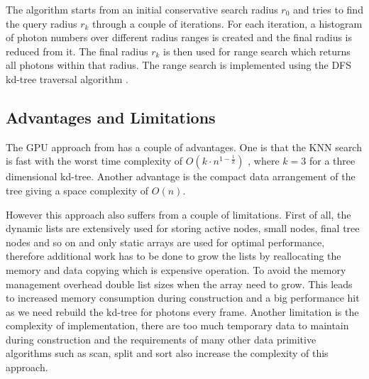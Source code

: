 The algorithm starts from an initial conservative search radius \(r_{0}\) and tries to find the query radius \(r_{k}\) through a couple of iterations. For each iteration, a histogram of photon numbers over different radius ranges is created and the final radius is reduced from it. The final radius \(r_{k}\) is then used for range search which returns all photons within that radius. The range search is implemented using the DFS kd-tree traversal algorithm \cite{Preparata:1985:CGI:4333}.

\subsection{Advantages and Limitations}
The GPU approach from \citeauthor{Zhou2008} has a couple of advantages. One is that the KNN search is fast with the worst time complexity of \(O(k\cdot n^{1-\frac{1}{k}})\) \cite{Lee1977}, where \(k = 3\) for a three dimensional kd-tree.
Another advantage is the compact data arrangement of the tree giving a space complexity of \(O(n)\).

However this approach also suffers from a couple of limitations. First of all, the dynamic lists are extensively used for storing active nodes, small nodes, final tree nodes and so on and only static arrays are used for optimal performance, therefore additional work has to be done to grow the lists by reallocating the memory and data copying which is expensive operation. To avoid the memory management overhead \citeauthor{Zhou2008} double list sizes when the array need to grow. This leads to increased memory consumption during construction and a big performance hit as we need rebuild the kd-tree for photons every frame. Another limitation is the complexity of implementation, there are too much temporary data to maintain during construction and the requirements of many other data primitive algorithms such as scan, split and sort also increase the complexity of this approach.
